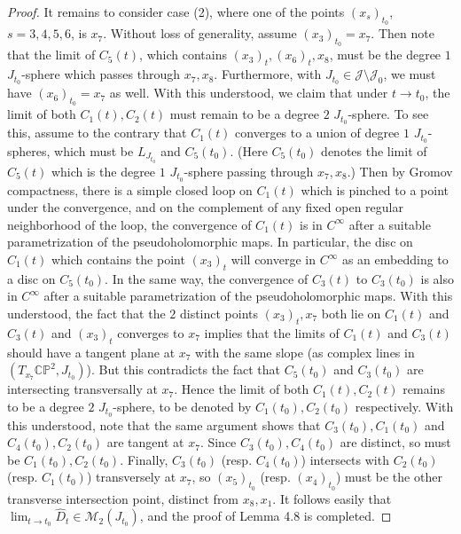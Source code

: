 \documentclass[11pt]{amsart}
\theoremstyle{plain}
\numberwithin{theorem}{section}
\theoremstyle{definition}
\newcommand{\C}{{\mathbb C}}
\renewcommand{\P}{{\mathbb P}}
\newcommand{\J}{{\mathcal J}}
\newcommand{\M}{{\mathcal M}}
\begin{document}
\begin{proof}
 It remains to consider case (2), where one of the points $(x_s)_{t_0}$, $s=3,4,5,6$, is $x_7$. Without loss of
 generality, assume $(x_3)_{t_0}=x_7$. Then note that the limit of $C_5(t)$, which contains $(x_3)_t,(x_6)_t, x_8$,
 must be the degree $1$ $J_{t_0}$-sphere which passes through $x_7,x_8$. Furthermore, with 
 $J_{t_0}\in \J\setminus \J_0$, we must have $(x_6)_{t_0}=x_7$ as well. With this understood, we claim that
 under $t\rightarrow t_0$, the limit of both $C_1(t),C_2(t)$ must remain to be a degree $2$ $J_{t_0}$-sphere. 
 To see this, assume to the contrary that $C_1(t)$ converges to a union of degree $1$ $J_{t_0}$-spheres, which must be $L_{J_{t_0}}$ and $C_5(t_0)$. (Here $C_5(t_0)$ denotes the limit of $C_5(t)$ which is the degree $1$ $J_{t_0}$-sphere passing through $x_7,x_8$.) Then by Gromov compactness, there is a simple closed loop on $C_1(t)$ which is pinched to a point under the convergence, and on the complement of any fixed open regular neighborhood of the loop, the convergence of $C_1(t)$ is in $C^\infty$ after a suitable parametrization of the pseudoholomorphic maps. In particular, the disc on $C_1(t)$ which contains the point $(x_3)_t$ will converge in
$C^\infty$ as an embedding to a disc on $C_5(t_0)$. In the same way, the convergence of $C_3(t)$ to 
$C_3(t_0)$ is also in $C^\infty$ after a suitable parametrization of the pseudoholomorphic maps. With this understood, the fact that the $2$ distinct points $(x_3)_t, x_7$ both lie on $C_1(t)$ and $C_3(t)$ and $(x_3)_t$
converges to $x_7$ implies that the limits of $C_1(t)$ and $C_3(t)$ should have
a tangent plane at $x_7$ with the same slope (as complex lines in $(T_{x_7} \C\P^2, J_{t_0})$). But this 
contradicts the fact that $C_5(t_0)$ and $C_3(t_0)$ are intersecting transversally at $x_7$. Hence the limit of 
both $C_1(t),C_2(t)$ remains to be a degree $2$ $J_{t_0}$-sphere, to be denoted by $C_1(t_0),C_2(t_0)$ respectively. With this understood, note that the same argument shows that $C_3(t_0),C_1(t_0)$ and $C_4(t_0),C_2(t_0)$ are tangent at $x_7$. Since  $C_3(t_0),C_4(t_0)$ are distinct, so must be $C_1(t_0),C_2(t_0)$. Finally, $C_3(t_0)$ (resp. $C_4(t_0)$) intersects with $C_2(t_0)$ (resp. $C_1(t_0)$) transversely at $x_7$, so $(x_5)_{t_0}$ (resp. $(x_4)_{t_0}$) must be the other transverse intersection point, distinct from $x_8,x_1$. It follows easily that $\lim_{t\rightarrow t_0} \hat{D}_t\in \M_2(J_{t_0})$, and the proof of Lemma 4.8 is completed. 
 

\end{proof}
\end{document}
